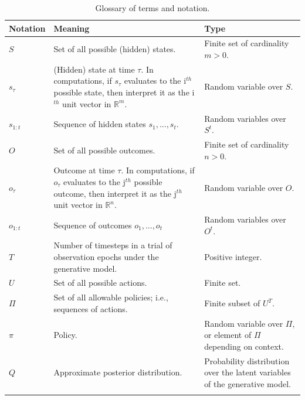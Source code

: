 \documentclass{article}
\begin{document}
\begin{longtabu} to \textwidth {
    X[1,c]
    X[4,c]
    X[3,c]}
    \caption{Glossary of terms and notation.} \label{table:2} \\
            \toprule
            Notation & Meaning & Type \\
            \midrule
$S$ &	Set of all possible (hidden) states. & Finite set of cardinality $m>0$.\\\addlinespace[0.3cm]

$s_\tau$ & (Hidden) state at time $\tau$. In computations, if $s_\tau$ evaluates to the i$^{th}$ possible state, then interpret it as the i$^{th}$ unit vector in $\mathbb R^m$. &
Random variable over $S$. \\\addlinespace[0.3cm]

$s_{1:t}$ & Sequence of hidden states $s_1,...,s_t$. & Random variables over $S^t$. \\\addlinespace[0.3cm]

$O$ &	Set of all possible outcomes. &	Finite set of cardinality $n>0$.\\\addlinespace[0.3cm]

$o_\tau$& Outcome at time $\tau$. In computations, if $o_\tau$ evaluates to the j$^{th}$ possible outcome, then interpret it as the j$^{th}$ unit vector in $\mathbb R^n$. &
Random variable over $O$. \\\addlinespace[0.3cm]

$o_{1:t}$ & Sequence of outcomes $o_1,...,o_t$ & Random variables over $O^t$.\\\addlinespace[0.3cm]
 
$T$ & Number of timesteps in a trial of observation epochs under the generative model. & Positive integer. \\\addlinespace[0.3cm]

$U$ & Set of all possible actions. & Finite set.\\\addlinespace[0.3cm]
 
$\Pi$ & Set of all allowable policies; i.e., sequences of actions. & Finite subset of $U^T$. \\\addlinespace[0.3cm]

$\pi$ & Policy. & Random variable over $\Pi$, or element of $\Pi$ depending on context. \\\addlinespace[0.3cm]

$Q$ & Approximate posterior distribution. & Probability distribution over the latent variables of the generative model.\\\addlinespace[0.3cm]
 

\end{longtabu}
\end{document}
